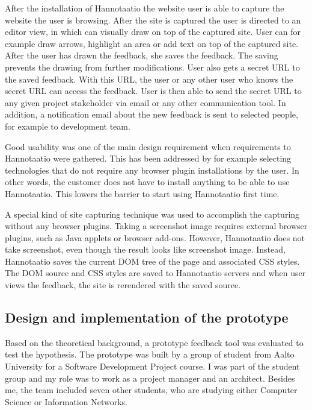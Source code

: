 \documentclass[english,12pt,a4paper,pdftex]{article}
\begin{document}
After the installation of Hannotaatio the website user is able to capture the website the user is browsing. After the site is captured the user is directed to an editor view, in which can visually draw on top of the captured site. User can for example draw arrows, highlight an area or add text on top of the captured site. After the user has drawn the feedback, she saves the feedback. The saving prevents the drawing from further modifications. User also gets a secret \ac{URL} to the saved feedback. With this \ac{URL}, the user or any other user who knows the secret \ac{URL} can access the feedback. User is then able to send the secret \ac{URL} to any given project stakeholder via email or any other communication tool. In addition, a notification email about the new feedback is sent to selected people, for example to development team.

Good usability was one of the main design requirement when requirements to Hannotaatio were gathered. This has been addressed by for example selecting technologies that do not require any browser plugin installations by the user. In other words, the customer does not have to install anything to be able to use Hannotaatio. This lowers the barrier to start using Hannotaatio first time.

A special kind of site capturing technique was used to accomplish the capturing without any browser plugins. Taking a screenshot image requires external browser plugins, such as Java applets or browser add-ons. However, Hannotaatio does not take screenshot, even though the result looks like screenshot image. Instead, Hannotaatio saves the current \ac{DOM} tree of the page and associated \ac{CSS} styles. The \ac{DOM} source and \ac{CSS} styles are saved to Hannotaatio servers and when user views the feedback, the site is rerendered with the saved source.

\subsection{Design and implementation of the prototype}

Based on the theoretical background, a prototype feedback tool was evaluated to test the hypothesis. The prototype was built by a group of student from Aalto University for a Software Development Project course. I was part of the student group and my role was to work as a project manager and an architect. Besides me, the team included seven other students, who are studying either Computer Science or Information Networks.
\end{document}
